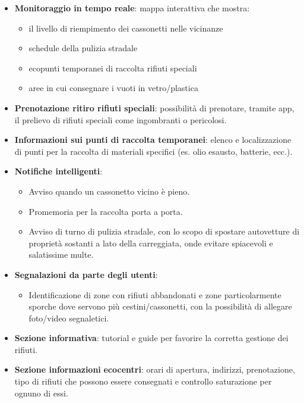 \begin{itemize}
    \item \textbf{Monitoraggio in tempo reale}: mappa interattiva che mostra: 
    \begin{itemize}
        \item il livello di riempimento dei cassonetti nelle vicinanze
    \end{itemize}
    \begin{itemize}
        \item schedule della pulizia stradale
        \item ecopunti temporanei di raccolta rifiuti speciali
        \item aree in cui consegnare i vuoti in vetro/plastica
    \end{itemize}
    \item \textbf{Prenotazione ritiro rifiuti speciali}: possibilit\`a di prenotare, tramite app, il prelievo di rifiuti speciali come ingombranti o pericolosi.
    \item \textbf{Informazioni sui punti di raccolta temporanei}: elenco e localizzazione di punti per la raccolta di materiali specifici (es. olio esausto, batterie, ecc.).
    \item \textbf{Notifiche intelligenti}:
    \begin{itemize}
        \item Avviso quando un cassonetto vicino \`e pieno.
        \item Promemoria per la raccolta porta a porta.
        \item Avviso di turno di pulizia stradale, con lo scopo di spostare autovetture di proprietà sostanti a lato della carreggiata, onde evitare spiacevoli e salatissime multe.
    \end{itemize}
    \item \textbf{Segnalazioni da parte degli utenti}:
    \begin{itemize}
        \item Identificazione di zone con rifiuti abbandonati e zone particolarmente sporche dove servono più cestini/cassonetti, con la possibilità di allegare foto/video segnaletici.
    \end{itemize}
    \item \textbf{Sezione informativa}: tutorial e guide per favorire la corretta gestione dei rifiuti.
    \item \textbf{Sezione informazioni }\textbf{ecocentri}: orari di apertura, indirizzi, prenotazione, tipo di rifiuti che possono essere consegnati e controllo saturazione per ognuno di essi.
\end{itemize}

